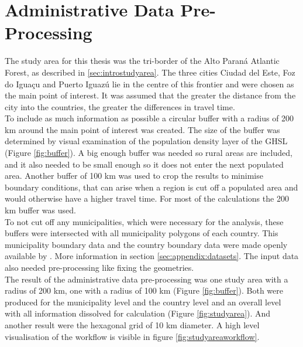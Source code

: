 \documentclass[11pt, a4paper]{report}
\begin{document}
\section{Administrative Data Pre-Processing}
The study area for this thesis was the tri-border of the Alto Paraná Atlantic Forest, as described in \ref{sec:introstudyarea}. The three cities Ciudad del Este, Foz do Iguaçu and  Puerto Iguazú lie in the centre of this frontier and were chosen as the main point of interest. It was assumed that the greater the distance from the city into the countries, the greater the differences in travel time. \\
%
To include as much information as possible a circular buffer with a radius of 200 km around the main point of interest was created. The size of the buffer was determined by visual examination of the population density layer of the GHSL \citep{european_commission_joint_research_centre_global_2021} (Figure \ref{fig:buffer}). A big enough buffer was needed so rural areas are included, and it also needed to be small enough so it does not enter the next populated area. Another buffer of 100 km was used to crop the results to minimise boundary conditions, that can arise when a region is cut off a populated area and would otherwise have a higher travel time. For most of the calculations the 200 km buffer was used. \\
%
To not cut off any municipalities, which were necessary for the analysis, these buffers were intersected with all municipality polygons of each country. This municipality boundary data and the country boundary data  were made openly available by \citet{runfola_geoboundaries_2020}. More information in section \ref{sec:appendix:datasets}. The input data also needed pre-processing like fixing the geometries.  \\
%
The result of the administrative data pre-processing was one study area with a radius of 200 km, one with a radius of 100 km (Figure \ref{fig:buffer}). Both were produced for the municipality level and the country level and an overall level with all information dissolved for calculation (Figure \ref{fig:studyarea}). And another result were the hexagonal grid of 10 km diameter. A high level visualisation of the workflow is visible in figure \ref{fig:studyareaworkflow}.
\end{document}
